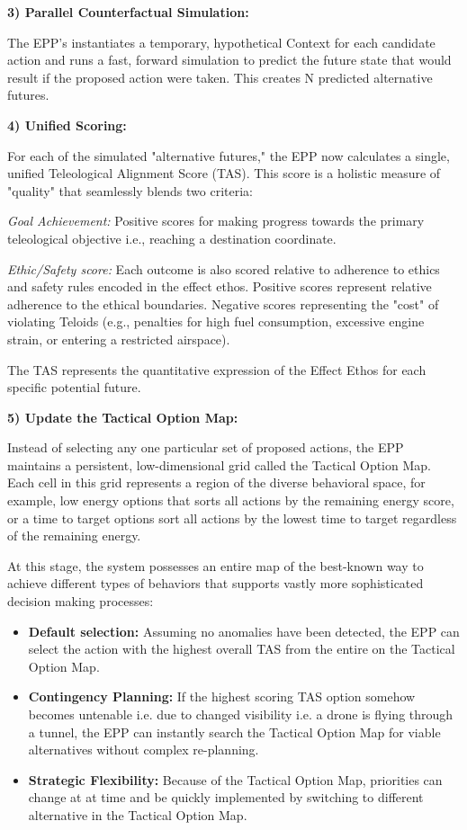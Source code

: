 \textbf{3) Parallel Counterfactual Simulation:}

The EPP's instantiates a temporary, hypothetical Context for each candidate action and runs a fast, forward simulation to predict the future state that would result if the proposed action were taken. This creates N predicted alternative futures.\newline

\textbf{4) Unified Scoring:}

For each of the simulated "alternative futures," the EPP now calculates a single, unified Teleological Alignment Score (TAS). This score is a holistic measure of "quality" that seamlessly blends two criteria:

\textit{Goal Achievement:} Positive scores for making progress towards the primary teleological objective i.e., reaching a destination coordinate. 

\textit{Ethic/Safety score:} Each outcome is also scored relative to adherence to ethics and safety rules encoded in the effect ethos. Positive scores represent relative adherence to the ethical boundaries. Negative scores representing the "cost" of violating Teloids (e.g., penalties for high fuel consumption, excessive engine strain, or entering a restricted airspace).

The TAS represents the quantitative expression of the Effect Ethos for each specific potential future.

\textbf{5) Update the Tactical Option Map:}

Instead of selecting any one particular set of proposed actions, the EPP maintains a persistent, low-dimensional grid called the Tactical Option Map. Each cell in this grid represents a region of the diverse behavioral space, for example, low energy options that sorts all actions by the remaining energy score, or a time to target options sort all actions by the lowest time to target regardless of the remaining energy. 


At this stage, the system possesses an entire map of the best-known way to achieve different types of behaviors that supports vastly more sophisticated decision making processes:

\begin{itemize} 
	\item \textbf{Default selection:} Assuming no anomalies have been detected, the EPP can select the action with the highest overall TAS from the entire on the Tactical Option Map.
	\item \textbf{Contingency Planning:} If the highest scoring TAS option somehow becomes untenable i.e. due to changed visibility i.e. a drone is flying through a tunnel, the EPP can instantly search the Tactical Option Map for viable alternatives without complex re-planning. 
	\item \textbf{Strategic Flexibility:} Because of the  Tactical Option Map, priorities can change at at time and be quickly implemented by switching to different alternative in the Tactical Option Map. 
 
\end{itemize} 
 

